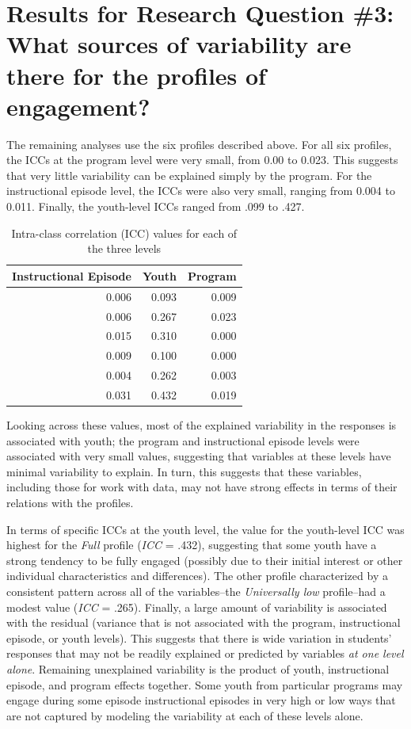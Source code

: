 \documentclass[]{book}
\theoremstyle{definition}
\theoremstyle{definition}
\theoremstyle{definition}
\theoremstyle{remark}
\begin{document}
\section{Results for Research Question \#3: What sources of variability
are there for the profiles of
engagement?}\label{results-for-research-question-3-what-sources-of-variability-are-there-for-the-profiles-of-engagement}

The remaining analyses use the six profiles described above. For all six
profiles, the ICCs at the program level were very small, from 0.00 to
0.023. This suggests that very little variability can be explained
simply by the program. For the instructional episode level, the ICCs
were also very small, ranging from 0.004 to 0.011. Finally, the
youth-level ICCs ranged from .099 to .427.

\begin{table}

\caption{\label{tab:unnamed-chunk-12}Intra-class correlation (ICC) values for each of the three levels}
\centering
\begin{tabular}[t]{rrr}
\toprule
Instructional Episode & Youth & Program\\
\midrule
0.006 & 0.093 & 0.009\\
0.006 & 0.267 & 0.023\\
0.015 & 0.310 & 0.000\\
0.009 & 0.100 & 0.000\\
0.004 & 0.262 & 0.003\\
0.031 & 0.432 & 0.019\\
\bottomrule
\end{tabular}
\end{table}

Looking across these values, most of the explained variability in the
responses is associated with youth; the program and instructional
episode levels were associated with very small values, suggesting that
variables at these levels have minimal variability to explain. In turn,
this suggests that these variables, including those for work with data,
may not have strong effects in terms of their relations with the
profiles.

In terms of specific ICCs at the youth level, the value for the
youth-level ICC was highest for the \emph{Full} profile (\emph{ICC} =
.432), suggesting that some youth have a strong tendency to be fully
engaged (possibly due to their initial interest or other individual
characteristics and differences). The other profile characterized by a
consistent pattern across all of the variables--the \emph{Universally
low} profile--had a modest value (\emph{ICC} = .265). Finally, a large
amount of variability is associated with the residual (variance that is
not associated with the program, instructional episode, or youth
levels). This suggests that there is wide variation in students'
responses that may not be readily explained or predicted by variables
\emph{at one level alone}. Remaining unexplained variability is the
product of youth, instructional episode, and program effects together.
Some youth from particular programs may engage during some episode
instructional episodes in very high or low ways that are not captured by
modeling the variability at each of these levels alone.
\end{document}
